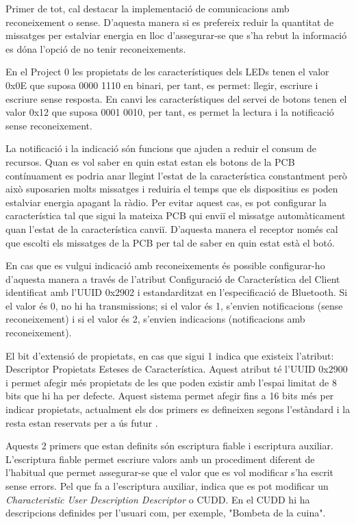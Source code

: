 Primer de tot, cal destacar la implementació de comunicacions amb reconeixement o sense. D'aquesta manera si es prefereix reduir la quantitat de missatges per estalviar energia en lloc d'assegurar-se que s'ha rebut la informació es dóna l'opció de no tenir reconeixements.

En el Project 0 les propietats de les característiques dels LEDs tenen el valor 0x0E que suposa  0000 1110 en binari, per tant, es permet: llegir, escriure i escriure sense resposta.
En canvi les característiques del servei de botons tenen el valor 0x12 que suposa 0001 0010, per tant, es permet la lectura i la notificació sense reconeixement.

La notificació i la indicació són funcions que ajuden a reduir el consum de recursos.
Quan es vol saber en quin estat estan els botons de la PCB contínuament es podria anar llegint l'estat de la característica constantment però això suposarien molts missatges i reduiria el temps que els dispositius es poden estalviar energia apagant la ràdio.
Per evitar aquest cas, es pot configurar la característica tal que sigui la mateixa PCB qui enviï el missatge automàticament quan l'estat de la característica canviï.
D'aquesta manera el receptor només cal que escolti els missatges de la PCB per tal de saber en quin estat està el botó.

En cas que es vulgui indicació amb reconeixements és possible configurar-ho d'aquesta manera a través de l'atribut Configuració de Característica del Client identificat amb l'UUID 0x2902 i estandarditzat en l'especificació de Bluetooth.
Si el valor és 0, no hi ha transmissions; si el valor és 1, s'envien notificacions (sense reconeixement) i si el valor és 2, s'envien indicacions (notificacions amb reconeixement). 

El bit d'extensió de propietats, en cas que sigui 1 indica que existeix l'atribut: Descriptor Propietats Esteses de Característica.
Aquest atribut té l'UUID 0x2900 i permet afegir més propietats de les que poden existir amb l'espai limitat de 8 bits que hi ha per defecte.
Aquest sistema permet afegir fins a 16 bits més per indicar propietats, actualment els dos primers es defineixen segons l'estàndard i la resta estan reservats per a ús futur \cite{extended properties}.

Aquests 2 primers que estan definits són escriptura fiable i escriptura auxiliar.
L'escriptura fiable permet escriure valors amb un procediment diferent de l'habitual que permet assegurar-se que el valor que es vol modificar s'ha escrit sense errors.
Pel que fa a l'escriptura auxiliar, indica que es pot modificar un \textit{Characteristic User Description Descriptor} o CUDD.
En el CUDD hi ha descripcions definides per l'usuari com, per exemple, "Bombeta de la cuina".


